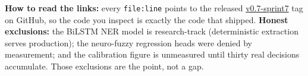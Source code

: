 \documentclass[11pt,a4paper]{article}
\begin{document}
\vspace{3mm}
\begin{tcolorbox}[colback=tintbg, colframe=tintbg, boxrule=0pt, arc=2mm,
  left=8pt, right=8pt, top=6pt, bottom=6pt]
\small
\textbf{How to read the links:} every \texttt{file:line} points to the released
\href{https://github.com/Jayant1711/Tax_Assist-system/releases/tag/v0.7-sprint7}{v0.7-sprint7}
tag on GitHub, so the code you inspect is exactly the code that shipped.
\textbf{Honest exclusions:} the BiLSTM NER model is research-track (deterministic
extraction serves production); the neuro-fuzzy regression heads were denied by
measurement; and the calibration figure is unmeasured until thirty real decisions
accumulate. Those exclusions are the point, not a gap.
\end{tcolorbox}
\end{document}
